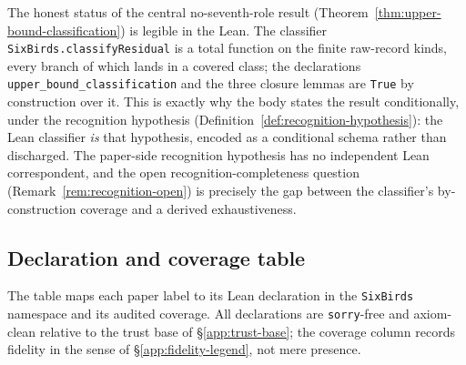 \documentclass[11pt]{article}
\theoremstyle{definition}
\begin{document}
The honest status of the central no-seventh-role result
(Theorem~\ref{thm:upper-bound-classification}) is legible in the Lean. The
classifier \texttt{SixBirds.classifyResidual} is a total function on the finite
raw-record kinds, every branch of which lands in a covered class; the
declarations \texttt{upper\_bound\_classification} and the three closure lemmas
are \texttt{True} by construction over it. This is exactly why the body states
the result conditionally, under the recognition hypothesis
(Definition~\ref{def:recognition-hypothesis}): the Lean classifier \emph{is} that
hypothesis, encoded as a conditional schema rather than discharged. The
paper-side recognition hypothesis has no independent Lean correspondent, and the
open recognition-completeness question (Remark~\ref{rem:recognition-open}) is
precisely the gap between the classifier's by-construction coverage and a derived
exhaustiveness.

\subsection{Declaration and coverage table}\label{app:table}

The table maps each paper label to its Lean declaration in the \texttt{SixBirds}
namespace and its audited coverage. All declarations are \texttt{sorry}-free and
axiom-clean relative to the trust base of \S\ref{app:trust-base}; the coverage
column records fidelity in the sense of \S\ref{app:fidelity-legend}, not mere
presence.
\end{document}
